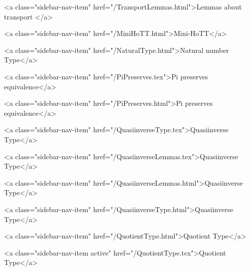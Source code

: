       
        
          <a class="sidebar-nav-item" href="/TransportLemmas.html">Lemmas about transport </a>
        
      
    
      
        
          <a class="sidebar-nav-item" href="/MiniHoTT.html">Mini-HoTT</a>
        
      
    
      
        
          <a class="sidebar-nav-item" href="/NaturalType.html">Natural number Type</a>
        
      
    
      
        
          <a class="sidebar-nav-item" href="/PiPreserves.tex">Pi preserves equivalence</a>
        
      
    
      
        
          <a class="sidebar-nav-item" href="/PiPreserves.html">Pi preserves equivalence</a>
        
      
    
      
        
          <a class="sidebar-nav-item" href="/QuasiinverseType.tex">Quasiinverse Type</a>
        
      
    
      
        
          <a class="sidebar-nav-item" href="/QuasiinverseLemmas.tex">Quasiinverse Type</a>
        
      
    
      
        
          <a class="sidebar-nav-item" href="/QuasiinverseLemmas.html">Quasiinverse Type</a>
        
      
    
      
        
          <a class="sidebar-nav-item" href="/QuasiinverseType.html">Quasiinverse Type</a>
        
      
    
      
        
          <a class="sidebar-nav-item" href="/QuotientType.html">Quotient Type</a>
        
      
    
      
        
          <a class="sidebar-nav-item active" href="/QuotientType.tex">Quotient Type</a>
        
